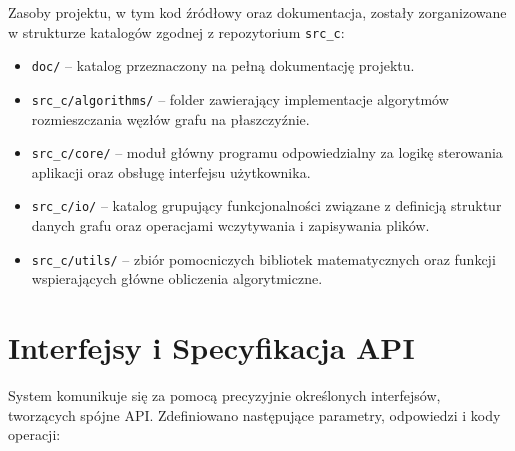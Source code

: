 \documentclass[12pt,a4paper]{article}
\begin{document}
Zasoby projektu, w tym kod źródłowy oraz dokumentacja, zostały zorganizowane w strukturze katalogów zgodnej z repozytorium \texttt{src\_c}: 

\begin{itemize} 
    \item \texttt{doc/} -- katalog przeznaczony na pełną dokumentację projektu. 
    \item \texttt{src\_c/algorithms/} -- folder zawierający implementacje algorytmów rozmieszczania węzłów grafu na płaszczyźnie. 
    \item \texttt{src\_c/core/} -- moduł główny programu odpowiedzialny za logikę sterowania aplikacji oraz obsługę interfejsu użytkownika. 
    \item \texttt{src\_c/io/} -- katalog grupujący funkcjonalności związane z definicją struktur danych grafu oraz operacjami wczytywania i zapisywania plików. 
    \item \texttt{src\_c/utils/} -- zbiór pomocniczych bibliotek matematycznych oraz funkcji wspierających główne obliczenia algorytmiczne. 
\end{itemize} 

\vspace{1.5cm} 

\section{Interfejsy i Specyfikacja API}

System komunikuje się za pomocą precyzyjnie określonych interfejsów, tworzących spójne API. Zdefiniowano następujące parametry, odpowiedzi i kody operacji: 
\end{document}
